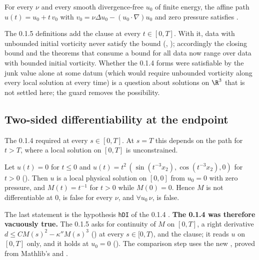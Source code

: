 \begin{theorem}
For every $\nu$ and every smooth divergence-free $u_0$ of finite energy, the affine path
$u(t)=u_0+t\,v_0$ with $v_0=\nu\Delta u_0-(u_0\cdot\nabla)u_0$ and zero pressure satisfies
.
\end{theorem}

The 0.1.5 definitions add the clause  at every
$t\in[0,T]$. With it, data with unbounded initial vorticity never satisfy the bound
(, ); accordingly the closing bound
 and the theorems that consume a bound for all data now range over data with
bounded initial vorticity. Whether the 0.1.4 forms were satisfiable by the junk value alone at some datum (which
would require unbounded vorticity along every local solution at every time) is a question about solutions on
$\R^3$ that is not settled here; the guard removes the possibility.

\subsection{Two-sided differentiability at the endpoint}
The 0.1.4  required  at every $s\in[0,T]$. At $s=T$ this
depends on the path for $t>T$, where a local solution on $[0,T]$ is unconstrained.

\begin{theorem}\label{thm:escape}
Let $u(t)=0$ for $t\le0$ and $u(t)=t^2\,(\sin(t^{-3}x_2),\cos(t^{-3}x_2),0)$ for $t>0$ (). Then $u$
is a local physical solution on $[0,0]$ from $u_0=0$ with zero pressure, and $M(t)=t^{-1}$ for $t>0$ while
$M(0)=0$. Hence $M$ is not differentiable at $0$,  is false for every $\nu$, and
$\forall u_0\,\nu$,  is false.
\end{theorem}

The last statement is the hypothesis \texttt{hDI} of the 0.1.4 . \textbf{The
0.1.4  was therefore vacuously true.} The 0.1.5  asks for
continuity of $M$ on $[0,T]$, a right derivative $d\le CM(s)^2-\kappa''M(s)^3$
() at every $s\in[0,T)$, and the  clause; it reads $u$ on
$[0,T]$ only, and it holds at $u_0=0$ (). The comparison step uses the new
, proved from Mathlib's
 and .

